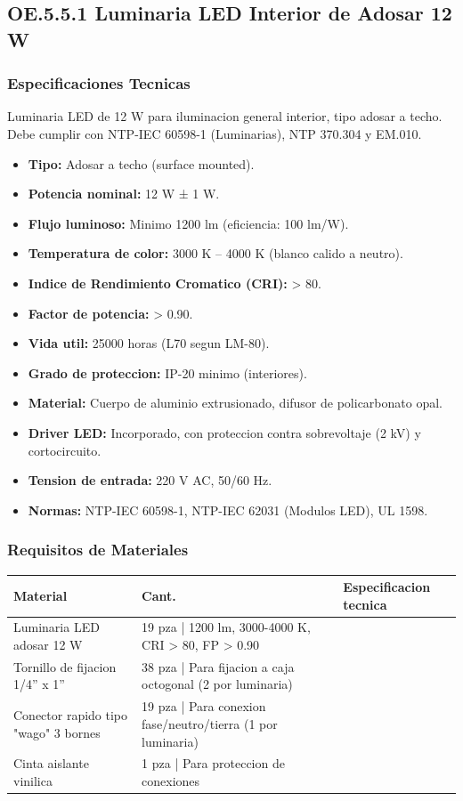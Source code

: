 \subsection{OE.5.5.1 Luminaria LED Interior de Adosar 12 W}

\subsubsection{Especificaciones Tecnicas}

Luminaria LED de 12 W para iluminacion general interior, tipo adosar a techo. Debe cumplir con NTP-IEC 60598-1 (Luminarias), NTP 370.304 y EM.010.

\begin{itemize}[nosep]
  \item \textbf{Tipo:} Adosar a techo (surface mounted).
  \item \textbf{Potencia nominal:} 12 W ± 1 W.
  \item \textbf{Flujo luminoso:} Minimo 1200 lm (eficiencia: 100 lm/W).
  \item \textbf{Temperatura de color:} 3000 K -- 4000 K (blanco calido a neutro).
  \item \textbf{Indice de Rendimiento Cromatico (CRI):} > 80.
  \item \textbf{Factor de potencia:} > 0.90.
  \item \textbf{Vida util:} 25000 horas (L70 segun LM-80).
  \item \textbf{Grado de proteccion:} IP-20 minimo (interiores).
  \item \textbf{Material:} Cuerpo de aluminio extrusionado, difusor de policarbonato opal.
  \item \textbf{Driver LED:} Incorporado, con proteccion contra sobrevoltaje (2 kV) y cortocircuito.
  \item \textbf{Tension de entrada:} 220 V AC, 50/60 Hz.
  \item \textbf{Normas:} NTP-IEC 60598-1, NTP-IEC 62031 (Modulos LED), UL 1598.
\end{itemize}

\subsubsection{Requisitos de Materiales}

\begin{longtable}{L{5.0cm} L{2.0cm} L{7.5cm}}
\toprule
\textbf{Material} & \textbf{Cant.} & \textbf{Especificacion tecnica} \\
\midrule
Luminaria LED adosar 12 W & 19 pza | 1200 lm, 3000-4000 K, CRI > 80, FP > 0.90 \\
Tornillo de fijacion 1/4'' x 1'' & 38 pza | Para fijacion a caja octogonal (2 por luminaria) \\
Conector rapido tipo "wago" 3 bornes & 19 pza | Para conexion fase/neutro/tierra (1 por luminaria) \\
Cinta aislante vinilica & 1 pza | Para proteccion de conexiones \\
\bottomrule
\end{longtable}

